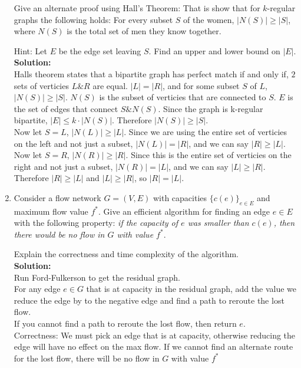 \documentclass[11pt]{article}
\begin{document}
\begin{enumerate}
Give an alternate proof using Hall's Theorem:
That is show that for $k$-regular graphs the following holds:
For every subset $S$ of the women, $|N(S)| \geq |S|$, 
where $N(S)$ is the total set of men they know together.

Hint: Let $E$ be the edge set leaving $S$.
Find an upper and lower bound on $|E|$.\\
\textbf{Solution:}\\
Halls theorem states that a bipartite graph has perfect match if and only if, $2$ sets of verticies $L \& R$ are equal. $|L| = |R|$, and for some subset $S$ of $L$, $|N(S)| \geq |S|$. $N(S)$ is the subset of verticies that are connected to $S$. $E$
is the set of edges that connect $S \& N(S)$. Since the graph is k-regular bipartite, $|E| \leq k \cdot |N(S)|$. Therefore $|N(S)| \geq |S|$.\\
Now let $S = L$, $|N(L)| \geq |L|$. Since we are using the entire set of verticies on the left and not just a subset, $|N(L)| = |R|$, and we can say $|R| \geq |L|$.\\
Now let $S = R$, $|N(R)| \geq |R|$. Since this is the entire set of verticies on the right and not just a subset, $|N(R)| = |L|$, and we can say $|L| \geq |R|$.\\
Therefore $|R| \geq |L|$ and $|L| \geq |R|$, so $|R| =|L|$.

\item
Consider a flow network $G=(V,E)$ with capacities $\{c(e)\}_{e\in
  E}$ and maximum flow value $f^*$. Give an efficient algorithm for finding an
edge $e\in E$ with the following property: {\em if the capacity of $e$
  was smaller than $c(e)$, then there would be no flow in $G$ with
  value $f^*$}. 

Explain the correctness and time complexity of the algorithm.\\
\textbf{Solution:}\\
Run Ford-Fulkerson to get the residual graph.\\
For any edge $e \in G$ that is at capacity in the residual graph, add the value we reduce the edge by to the negative edge and find a path to reroute the lost flow.\\
If you cannot find a path to reroute the lost flow, then return $e$.\\

Correctness: We must pick an edge that is at capacity, otherwise reducing the edge will have no effect on the max flow. If we cannot find an alternate route for the lost flow, there will be no flow in $G$ with value $f^*$


\end{enumerate}
\end{document}
